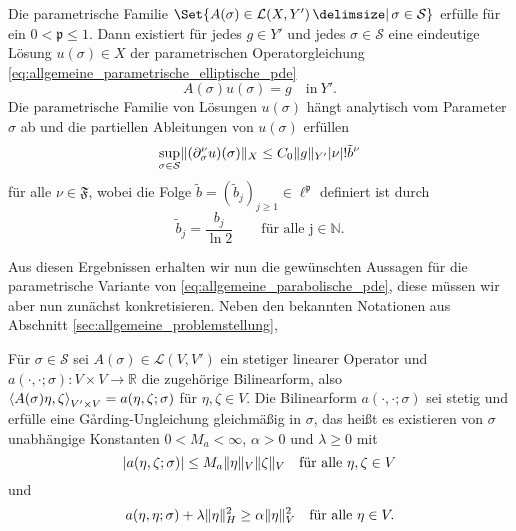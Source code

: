 \begin{Satz}
    \label{thm:kunoth:theorem4}
    Die parametrische Familie $\Set{ A(\sigma) \in \mathcal L(X, Y') \given \sigma \in \mathcal S }$ erfülle  für ein $0 < \mathfrak p \leq 1$.
    Dann existiert für jedes $g \in Y'$ und jedes $\sigma \in \mathcal S$ eine eindeutige Lösung $u(\sigma) \in X$ der parametrischen Operatorgleichung \eqref{eq:allgemeine_parametrische_elliptische_pde}
    \begin{equation}
        A(\sigma) u(\sigma) = g \quad \text{in}~Y'.
    \end{equation}
    Die parametrische Familie von Lösungen $u(\sigma)$ hängt analytisch vom Parameter $\sigma$ ab und die partiellen Ableitungen von $u(\sigma)$ erfüllen
    \begin{equation}
        \label{eq:kunoth:schranke_part_abl}
        \sup_{\sigma \in \mathcal S} \lVert(\partial^{\nu}_{\sigma} u)(\sigma)\rVert_{X} \leq C_{0} \lVert g\rVert_{Y'} \lvert\nu\rvert! \tilde{b}^{\nu}
    \end{equation}
    für alle $\nu \in \mathfrak F$, wobei die Folge $\tilde{b} = (\tilde{b}_{j})_{j \geq 1} \in \ell^{\mathfrak p}$ definiert ist durch
    \begin{equation}
        \tilde{b}_{j} = \frac{b_{j}}{\ln 2} \qquad \text{für alle j} \in \mathbb{N}.
    \end{equation}
\end{Satz}

Aus diesen Ergebnissen erhalten wir nun die gewünschten Aussagen für die parametrische Variante von \eqref{eq:allgemeine_parabolische_pde}, diese müssen wir aber nun zunächst konkretisieren.
Neben den bekannten Notationen aus Abschnitt \ref{sec:allgemeine_problemstellung},

Für $\sigma \in \mathcal S$ sei $A(\sigma) \in \mathcal L(V, V')$ ein stetiger linearer Operator und $a(\cdot, \cdot; \sigma) \colon V \times V \to \mathbb{R}$ die zugehörige Bilinearform, also $\left\langle A(\sigma) \eta,\zeta\right\rangle_{V' \times V} = a(\eta, \zeta; \sigma)$ für $\eta, \zeta \in V$.
Die Bilinearform $a(\cdot, \cdot; \sigma)$ sei stetig und erfülle eine G\aa rding-Ungleichung gleichmäßig in $\sigma$, das heißt es existieren von $\sigma$ unabhängige Konstanten $0 < M_{a} < \infty$, $\alpha > 0$ und $\lambda \geq 0$ mit
\begin{equation}
    \label{eq:allgemeine_parabolische_pde:bf_stetig_parametrisch}
    \lvert a(\eta, \zeta; \sigma)\rvert \leq M_{a} \lVert\eta\rVert_{V} \lVert\zeta\rVert_{V} \quad \text{für alle}~\eta, \zeta \in V
\end{equation}
und
\begin{equation}
    \label{eq:allgemeine_parabolische_pde:bf_garding_parametrisch}
    a(\eta, \eta; \sigma) + \lambda \lVert\eta\rVert_{H}^{2} \geq \alpha \lVert\eta\rVert_{V}^{2} \quad \text{für alle}~\eta \in V.
\end{equation}

